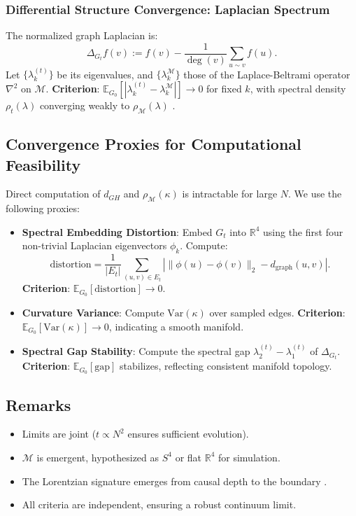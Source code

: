 \documentclass[11pt, a4paper]{article}
\begin{document}
\subsubsection{Differential Structure Convergence: Laplacian Spectrum}
The normalized graph Laplacian is:
\[
\Delta_{G_t} f(v) := f(v) - \frac{1}{\deg(v)} \sum_{u \sim v} f(u).
\]
Let $\{\lambda_k^{(t)}\}$ be its eigenvalues, and $\{\lambda_k^{\mathcal{M}}\}$ those of the Laplace-Beltrami operator $\nabla^2$ on $\mathcal{M}$. \textbf{Criterion}: $\mathbb{E}_{G_0} [ |\lambda_k^{(t)} - \lambda_k^{\mathcal{M}}| ] \to 0$ for fixed $k$, with spectral density $\rho_t(\lambda)$ converging weakly to $\rho_{\mathcal{M}}(\lambda)$ \cite{belkin2008}.

\subsection{Convergence Proxies for Computational Feasibility}
Direct computation of $d_{GH}$ and $\rho_{\mathcal{M}}(\kappa)$ is intractable for large $N$. We use the following proxies:
\begin{itemize}
  \item \textbf{Spectral Embedding Distortion}: Embed $G_t$ into $\mathbb{R}^4$ using the first four non-trivial Laplacian eigenvectors $\phi_k$. Compute:
  \[
  \text{distortion} = \frac{1}{|E_t|} \sum_{(u,v) \in E_t} \left| \|\phi(u) - \phi(v)\|_2 - d_{\text{graph}}(u,v) \right|.
  \]
  \textbf{Criterion}: $\mathbb{E}_{G_0} [\text{distortion}] \to 0$.
  \item \textbf{Curvature Variance}: Compute $\text{Var}(\kappa)$ over sampled edges. \textbf{Criterion}: $\mathbb{E}_{G_0} [\text{Var}(\kappa)] \to 0$, indicating a smooth manifold.
  \item \textbf{Spectral Gap Stability}: Compute the spectral gap $\lambda_2^{(t)} - \lambda_1^{(t)}$ of $\Delta_{G_t}$. \textbf{Criterion}: $\mathbb{E}_{G_0} [\text{gap}]$ stabilizes, reflecting consistent manifold topology.
\end{itemize}

\subsection{Remarks}
\begin{itemize}
  \item Limits are joint ($t \propto N^2$ ensures sufficient evolution).
  \item $\mathcal{M}$ is emergent, hypothesized as $S^4$ or flat $\mathbb{R}^4$ for simulation.
  \item The Lorentzian signature emerges from causal depth to the boundary \cite{fisher2025}.
  \item All criteria are independent, ensuring a robust continuum limit.
\end{itemize}
\end{document}

